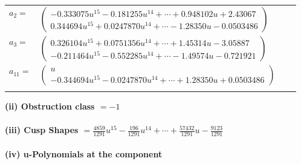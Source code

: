 \documentclass[1p]{elsarticle_modified}
\theoremstyle{definition}
\begin{document}
\begin{tabular}{m{7pt} m{180pt} m{7pt} m{180pt} }
\flushright $a_{2}=$&$\begin{pmatrix}-0.333075 u^{15}-0.181255 u^{14}+\cdots+0.948102 u+2.43067\\0.344694 u^{15}+0.0247870 u^{14}+\cdots-1.28350 u-0.0503486\end{pmatrix}$ \\
\flushright $a_{3}=$&$\begin{pmatrix}0.326104 u^{15}+0.0751356 u^{14}+\cdots+1.45314 u-3.05887\\-0.211464 u^{15}-0.552285 u^{14}+\cdots-1.49574 u-0.721921\end{pmatrix}$ \\
\flushright $a_{11}=$&$\begin{pmatrix}u\\-0.344694 u^{15}-0.0247870 u^{14}+\cdots+1.28350 u+0.0503486\end{pmatrix}$\\&\end{tabular}
\flushleft \textbf{(ii) Obstruction class $= -1$}\\~\\
\flushleft \textbf{(iii) Cusp Shapes $= \frac{4859}{1291} u^{15}-\frac{196}{1291} u^{14}+\cdots+\frac{57432}{1291} u-\frac{9123}{1291}$}\\~\\
\newpage\renewcommand{\arraystretch}{1}
\flushleft \textbf{(iv) u-Polynomials at the component}\newline \\
\end{document}
